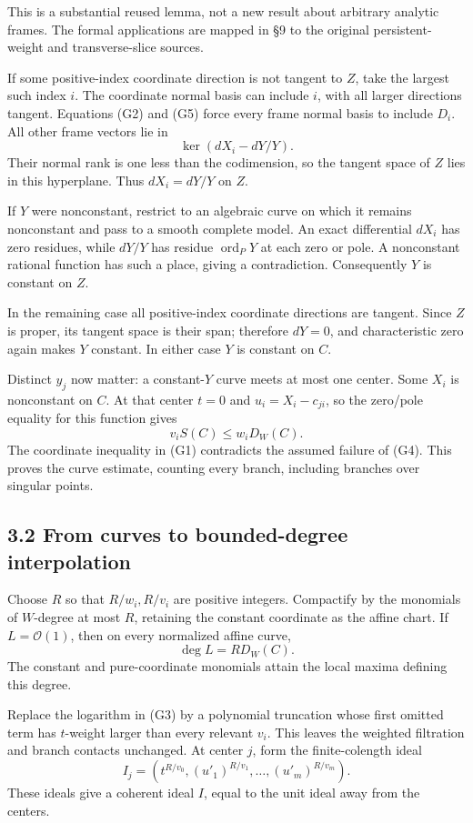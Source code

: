 \documentclass[11pt]{article}
\begin{document}
This is a substantial reused lemma, not a new result about arbitrary
analytic frames. The formal applications are mapped in §9 to the
original persistent-weight and transverse-slice sources.

If some positive-index coordinate direction is not tangent to \(Z\),
take the largest such index \(i\). The coordinate normal basis can
include \(i\), with all larger directions tangent. Equations (G2) and
(G5) force every frame normal basis to include \(D_i\). All other frame
vectors lie in \[
\ker(dX_i-dY/Y).
\] Their normal rank is one less than the codimension, so the tangent
space of \(Z\) lies in this hyperplane. Thus \(dX_i=dY/Y\) on \(Z\).

If \(Y\) were nonconstant, restrict to an algebraic curve on which it
remains nonconstant and pass to a smooth complete model. An exact
differential \(dX_i\) has zero residues, while \(dY/Y\) has residue
\(\operatorname{ord}_P Y\) at each zero or pole. A nonconstant rational
function has such a place, giving a contradiction. Consequently \(Y\) is
constant on \(Z\).

In the remaining case all positive-index coordinate directions are
tangent. Since \(Z\) is proper, its tangent space is their span;
therefore \(dY=0\), and characteristic zero again makes \(Y\) constant.
In either case \(Y\) is constant on \(C\).

Distinct \(y_j\) now matter: a constant-\(Y\) curve meets at most one
center. Some \(X_i\) is nonconstant on \(C\). At that center \(t=0\) and
\(u_i=X_i-c_{ji}\), so the zero/pole equality for this function gives \[
v_iS(C)\le w_iD_W(C).
\] The coordinate inequality in (G1) contradicts the assumed failure of
(G4). This proves the curve estimate, counting every branch, including
branches over singular points.

\subsection{3.2 From curves to bounded-degree
interpolation}\label{from-curves-to-bounded-degree-interpolation}

Choose \(R\) so that \(R/w_i,R/v_i\) are positive integers. Compactify
by the monomials of \(W\)-degree at most \(R\), retaining the constant
coordinate as the affine chart. If \(L=\mathcal O(1)\), then on every
normalized affine curve, \[
\deg L=R D_W(C).
\] The constant and pure-coordinate monomials attain the local maxima
defining this degree.

Replace the logarithm in (G3) by a polynomial truncation whose first
omitted term has \(t\)-weight larger than every relevant \(v_i\). This
leaves the weighted filtration and branch contacts unchanged. At center
\(j\), form the finite-colength ideal \[
I_j=(t^{R/v_0},(u'_1)^{R/v_1},\ldots,(u'_m)^{R/v_m}).
\] These ideals give a coherent ideal \(I\), equal to the unit ideal
away from the centers.
\end{document}
